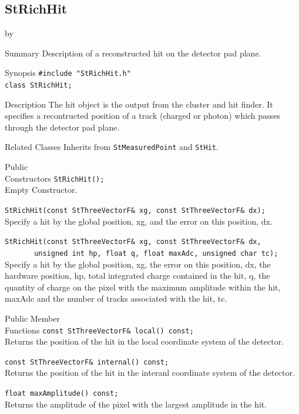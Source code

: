 \documentclass[twoside]{article}
\newcommand{\entrylabel}[1]{\mbox{\textbf{{#1}}}\hfil}%
\newenvironment{entry}
{\begin{list}{}%
    {\renewcommand{\makelabel}{\entrylabel}%
     \setlength{\labelwidth}{90pt}%
     \setlength{\leftmargin}{\labelwidth}
     \advance\leftmargin by \labelsep%
      }%
    }%
  {\end{list}}
\newcommand{\Entrylabel}[1]%
{\raisebox{0pt}[1ex][0pt]{\makebox[\labelwidth][l]%
    {\parbox[t]{\labelwidth}{\hspace{0pt}\textbf{{#1}}}}}}
\newenvironment{Entry}%
{\renewcommand{\entrylabel}{\Entrylabel}\begin{entry}}%
  {\end{entry}}
\begin{document}
\subsection{StRichHit}
\label{sec:StRichHit}
\begin{Entry}
\item[Summary] Description of a reconstructed hit on the detector
    pad plane.
\item[Synopsis]
    \verb+#include "StRichHit.h"+\\
    \verb+class StRichHit;+\\
\item[Description] The hit object is the output from the
    cluster and hit finder.  It specifies a recontructed position
    of a track (charged or photon) which passes through the
    detector pad plane.
\item[Related Classes]
    Inherits from \texttt{StMeasuredPoint} and \texttt{StHit}.
\item[Public\\ Constructors]
    \verb+StRichHit();+\\
    Empty Constructor.
    
    \verb+StRichHit(const StThreeVectorF& xg, const StThreeVectorF& dx);+\\
    Specify a hit by the global position, xg, and the error on this
    position, dx.

    \verb+StRichHit(const StThreeVectorF& xg, const StThreeVectorF& dx,+\\
    \verb+       unsigned int hp, float q, float maxAdc, unsigned char tc);+\\
    Specify a hit by the global position, xg, the error on this
    position, dx, the hardware position, hp, total integrated charge
    contained in the hit, q, the quantity of charge on the pixel with
    the maximum amplitude within the hit, maxAdc and the number of
    tracks associated with the hit, tc.
\item[Public Member\\ Functions]
    \verb+const StThreeVectorF& local() const;+\\
    Returns the position of the hit in the local coordinate
    system of the detector.

    \verb+const StThreeVectorF& internal() const;+\\
    Returns the position of the hit in the interanl coordinate
    system of the detector.

    \verb+float maxAmplitude() const;+\\
    Returns the amplitude of the pixel with the largest
    amplitude in the hit.


\end{Entry}
\end{document}
